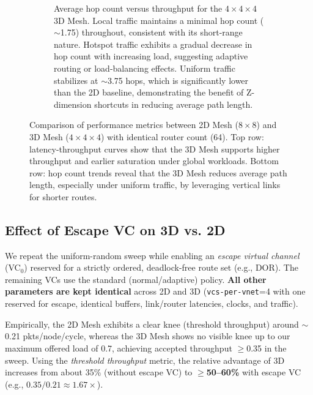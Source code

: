 \documentclass[11pt]{article}
\newcommand{\NumRoutersA}{64}         %
\begin{document}
\begin{figure}[htbp]
\begin{subfigure}[t]{0.45\linewidth}
        \caption{Average hop count versus throughput for the $4{\times}4{\times}4$ 3D Mesh. Local traffic maintains a minimal hop count ($\sim$1.75) throughout, consistent with its short-range nature. Hotspot traffic exhibits a gradual decrease in hop count with increasing load, suggesting adaptive routing or load-balancing effects. Uniform traffic stabilizes at $\sim$3.75 hops, which is significantly lower than the 2D baseline, demonstrating the benefit of Z-dimension shortcuts in reducing average path length.}
        \label{fig:mesh3d-hops}
    \end{subfigure}
    
    \caption{Comparison of performance metrics between 2D Mesh ($8{\times}8$) and 3D Mesh ($4{\times}4{\times}4$) with identical router count (\NumRoutersA). Top row: latency-throughput curves show that the 3D Mesh supports higher throughput and earlier saturation under global workloads. Bottom row: hop count trends reveal that the 3D Mesh reduces average path length, especially under uniform traffic, by leveraging vertical links for shorter routes.}
    \label{fig:mesh-comparison-full}
\end{figure}

\subsection{Effect of Escape VC on 3D vs. 2D}
\label{subsec:escape-vc}
We repeat the uniform-random sweep while enabling an \emph{escape virtual channel} (VC$_0$) reserved for a strictly ordered, deadlock-free route set (e.g., DOR). The remaining VCs use the standard (normal/adaptive) policy. \textbf{All other parameters are kept identical} across 2D and 3D (\texttt{vcs-per-vnet}=4 with one reserved for escape, identical buffers, link/router latencies, clocks, and traffic).


Empirically, the 2D Mesh exhibits a clear knee (threshold throughput) around $\sim$0.21 pkts/node/cycle, whereas the 3D Mesh shows no visible knee up to our maximum offered load of 0.7, achieving accepted throughput $\geq$0.35 in the sweep. Using the \emph{threshold throughput} metric, the relative advantage of 3D increases from about 35\% (without escape VC) to \textbf{$\geq$50--60\%} with escape VC (e.g., $0.35/0.21\approx1.67\times$).
\end{document}
